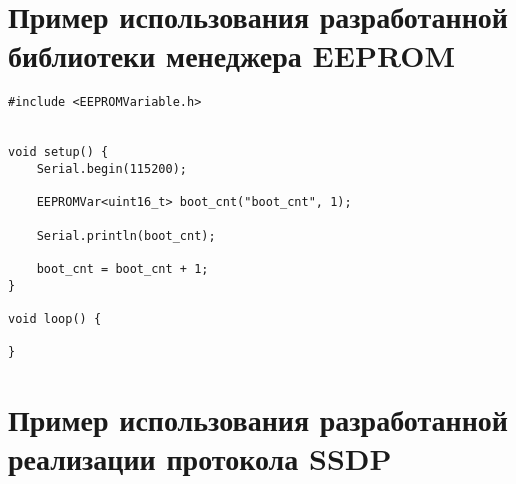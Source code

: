 \chapter{Пример использования разработанной библиотеки менеджера EEPROM} \label{appendix:eeprom-usage-example}

\begin{verbatim}
#include <EEPROMVariable.h>


void setup() {
    Serial.begin(115200);

    EEPROMVar<uint16_t> boot_cnt("boot_cnt", 1);

    Serial.println(boot_cnt);

    boot_cnt = boot_cnt + 1;
}

void loop() {

}
\end{verbatim}


\chapter{Пример использования разработанной реализации протокола SSDP} \label{appendix:ssdp-usage-example}


